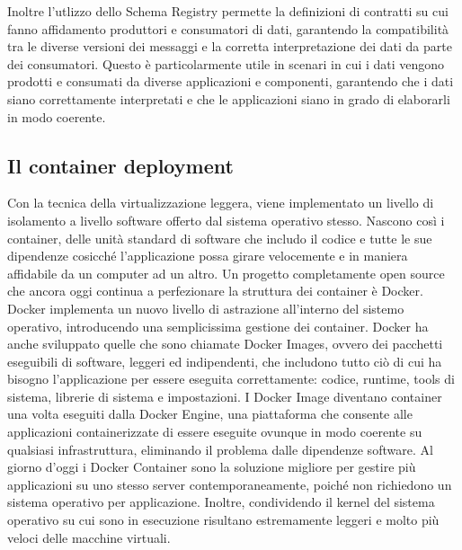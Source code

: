 Inoltre l'utlizzo dello Schema Registry permette la definizioni di contratti su cui fanno affidamento produttori e consumatori di dati, garantendo la compatibilità tra le diverse versioni dei messaggi e la corretta interpretazione dei dati da parte dei consumatori. Questo è particolarmente utile in scenari in cui i dati vengono prodotti e consumati da diverse applicazioni e componenti, garantendo che i dati siano correttamente interpretati e che le applicazioni siano in grado di elaborarli in modo coerente.


\subsection{Il container deployment}
Con la tecnica della virtualizzazione leggera, viene implementato un livello di
isolamento a livello software offerto dal sistema
operativo stesso. Nascono così i container, delle unità standard di software che includo il
codice e tutte le sue dipendenze cosicché l’applicazione possa girare velocemente e
in maniera affidabile da un computer ad un altro.
Un progetto completamente open source che ancora oggi continua a perfezionare
la struttura dei container è Docker. Docker implementa un nuovo livello di
astrazione all’interno del sistemo operativo, introducendo una semplicissima gestione
dei container.
Docker ha anche sviluppato quelle che sono chiamate Docker Images, ovvero dei
pacchetti eseguibili di software, leggeri ed indipendenti, che includono tutto ciò di
cui ha bisogno l’applicazione per essere eseguita correttamente: codice, runtime,
tools di sistema, librerie di sistema e impostazioni. I Docker Image diventano
container una volta eseguiti dalla Docker Engine, una piattaforma che consente alle applicazioni containerizzate di essere eseguite ovunque in modo coerente su
qualsiasi infrastruttura, eliminando il problema dalle dipendenze software.
Al giorno d’oggi i Docker Container sono la soluzione migliore per gestire più
applicazioni su uno stesso server contemporaneamente, poiché non richiedono un
sistema operativo per applicazione. Inoltre, condividendo il kernel del sistema
operativo su cui sono in esecuzione risultano estremamente leggeri e molto più
veloci delle macchine virtuali.


